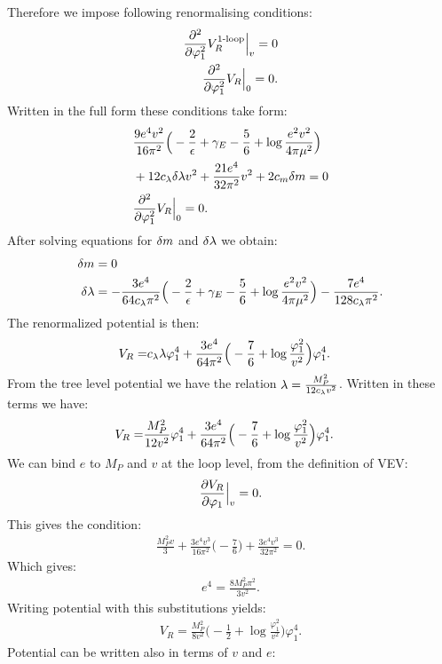 Therefore we impose following renormalising conditions:
\begin{align}
\frac{\partial^2 }{\partial \varphi_1^2}V_R^{\textrm{1-loop}}\Big|_{v}=0 \\
\frac{\partial^2 }{\partial \varphi_1^2}V_R\Big|_{0}=0.
\end{align}
Written in the full form these conditions take form:
\begin{align}
&\frac{9e^4v^2}{16\pi^2}\Big(-\frac{2}{\epsilon}+\gamma_E-\frac{5}{6}+\log\frac{e^2
v^2}{4\pi\mu^2}\Big) \notag\\
&+12c_\lambda\delta\lambda v^2+\frac{21e^4}{32\pi^2}v^2+2c_m\delta m = 0 \\
&\frac{\partial^2 }{\partial \varphi_1^2}V_R\Big|_{0} = 0.
\end{align}
After solving equations for $\delta m$ and $\delta\lambda$ we obtain:
\begin{align}
\delta m &= 0 \\
\delta\lambda &= -\frac{3e^4}{64c_\lambda\pi^2}\Big(-\frac{2}{\epsilon}+\gamma_E-\frac{5}{6}+
\log\frac{e^2v^2}{4\pi\mu^2}\Big)-\frac{7e^4}{128c_\lambda\pi^2}.
\end{align}
The renormalized potential is then:
\begin{align}
V_R = &c_\lambda\lambda\varphi_1^4 +
\frac{3e^4}{64\pi^2}\Big(-\frac{7}{6}+\log\frac{\varphi_1^2}{v^2}\Big)\varphi_1^4.
\end{align}
From the tree level potential we have the relation $\lambda = \frac{M_P^2}{12c_\lambda v^2}$. 
Written in these terms we have:
\begin{align}
V_R = &\frac{M_P^2}{12v^2}\varphi_1^4 +
\frac{3e^4}{64\pi^2}\Big(-\frac{7}{6}+\log\frac{\varphi_1^2}{v^2}\Big)\varphi_1^4.
\end{align}
We can bind $e$ to $M_P$ and $v$ at the loop level, from the definition of VEV:
\begin{align}
\frac{\partial V_R}{\partial \varphi_1} \Big|_v= 0.
\end{align}
This gives the condition:
\begin{align}
\frac{M_P^2v}{3}+\frac{3e^4v^3}{16\pi^2}\Big(-\frac{7}{6}\Big)+\frac{3e^4v^3}{32\pi^2}=0.
\end{align}
Which gives:
\begin{align}
e^4 = \frac{8M_P^2\pi^2}{3v^2}.
\end{align}
Writing potential with this substitutions yields:
\begin{align}
V_R = \frac{M_P^2}{8v^2}\Big(-\frac{1}{2}+\log\frac{\varphi_1^2}{v^2}\Big)\varphi_1^4.
\end{align}
Potential can be written also in terms of $v$ and $e$:

